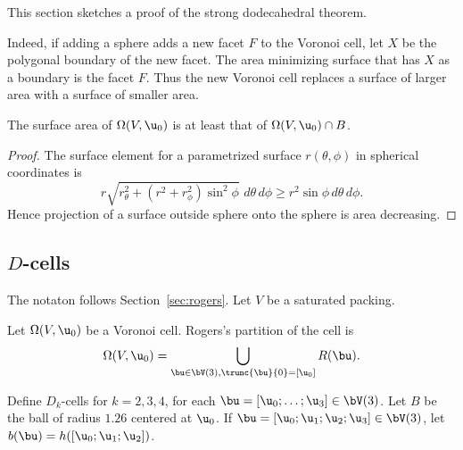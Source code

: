 This section sketches a proof of the strong dodecahedral theorem.  

  Indeed, if adding a sphere adds a new facet $F$
to the Voronoi cell, let $X$ be the polygonal boundary of the new facet.  
The area minimizing surface that has $X$ as a boundary is the facet $F$.  Thus the new Voronoi cell
replaces a surface of larger area with a surface of smaller area.


\begin{lemma}[]
The surface area of $\Omega(V, \u_0)$ is at least that
of $\Omega(V, \u_0)\cap B$.
\end{lemma}
%
%

\begin{proof} The surface element for a parametrized surface $r(\theta,\phi)$ in
spherical coordinates is
\begin{displaymath}
%
r \sqrt{r_\theta^2 + (r^2 + r_\phi^2)\sin^2\phi } \,\,d\theta\,d\phi \ge r^2 \sin\phi\, d\theta\,d\phi.
\end{displaymath}
Hence projection of a surface outside sphere onto the sphere is area decreasing.
\end{proof}

\subsection{$D$-cells}



The
notaton follows Section~\ref{sec:rogers}.  Let $V$ be a saturated packing.

Let $\Omega( V,\u_0)$ be a Voronoi cell.  Rogers's partition of the cell
is
\begin{displaymath}
\Omega(V, \u_0) = \bigcup_{ \bu\in  \bV(3), \trunc{\bu}{0}= [\u_0] } R( \bu).
\end{displaymath}
%
%


Define $D_k$-cells for $k=2,3,4$, for each $ \bu=[\u_0;\ldots;\u_3]\in \bV(3)$.
Let $B$ be the ball of radius $1.26$ centered at $ \u_0$.  If $\bu =[\u_0;\u_1;\u_2;\u_3]\in \bV(3)$, let
$b(\bu) = h([ \u_0; \u_1; \u_2])$.
%
%

